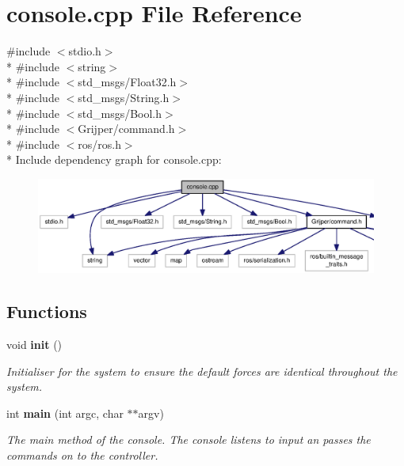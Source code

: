 \section{console.\-cpp File Reference}
\label{console_8cpp}
{\ttfamily \#include $<$stdio.\-h$>$}\\*
{\ttfamily \#include $<$string$>$}\\*
{\ttfamily \#include $<$std\-\_\-msgs/\-Float32.\-h$>$}\\*
{\ttfamily \#include $<$std\-\_\-msgs/\-String.\-h$>$}\\*
{\ttfamily \#include $<$std\-\_\-msgs/\-Bool.\-h$>$}\\*
{\ttfamily \#include $<$Grijper/command.\-h$>$}\\*
{\ttfamily \#include $<$ros/ros.\-h$>$}\\*
Include dependency graph for console.\-cpp\-:\nopagebreak
\begin{figure}[H]
\begin{center}
\leavevmode
\includegraphics[width=350pt]{console_8cpp__incl}
\end{center}
\end{figure}
\subsection*{Functions}
\begin{DoxyCompactItemize}
\item 
void {\bf init} ()
\begin{DoxyCompactList}\small\item\em Initialiser for the system to ensure the default forces are identical throughout the system. \end{DoxyCompactList}\item 
int {\bf main} (int argc, char $\ast$$\ast$argv)
\begin{DoxyCompactList}\small\item\em The main method of the console. The console listens to input an passes the commands on to the controller. \end{DoxyCompactList}\end{DoxyCompactItemize}
